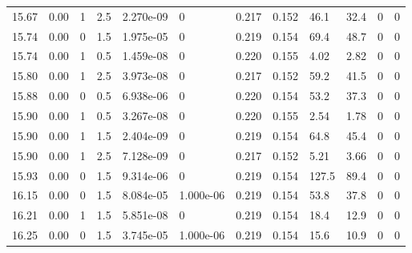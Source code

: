 \documentclass[preview]{standalone}
\begin{document}
{{{{{{{\begin{tabular}{L{1.2cm}C{1.2cm} C{0.3cm}C{0.5cm} C{1.4cm}C{1.4cm} C{1.4cm}C{1.4cm} C{1.6cm}C{1.6cm} C{1.6cm}C{1.6cm}}
  15.67  &  0.00  & 1     & 2.5 &  2.270e-09  & 0  &  0.217&   0.152& 46.1 & 32.4   &  0 & 0  \\ 
  15.74  &  0.00  & 0     & 1.5 &  1.975e-05  & 0  &  0.219&   0.154& 69.4 & 48.7   &  0 & 0  \\ 
  15.74  &  0.00  & 1     & 0.5 &  1.459e-08  & 0  &  0.220&   0.155& 4.02 & 2.82   &  0 & 0  \\ 
  15.80  &  0.00  & 1     & 2.5 &  3.973e-08  & 0  &  0.217&   0.152& 59.2 & 41.5   &  0 & 0  \\ 
  15.88  &  0.00  & 0     & 0.5 &  6.938e-06  & 0  &  0.220&   0.154& 53.2 & 37.3   &  0 & 0  \\ 
  15.90  &  0.00  & 1     & 0.5 &  3.267e-08  & 0  &  0.220&   0.155& 2.54 & 1.78   &  0 & 0  \\ 
  15.90  &  0.00  & 1     & 1.5 &  2.404e-09  & 0  &  0.219&   0.154& 64.8 & 45.4   &  0 & 0  \\ 
  15.90  &  0.00  & 1     & 2.5 &  7.128e-09  & 0  &  0.217&   0.152& 5.21 & 3.66   &  0 & 0  \\ 
  15.93  &  0.00  & 0     & 1.5 &  9.314e-06  & 0  &  0.219&   0.154& 127.5 & 89.4   &  0 & 0  \\ 
  16.15  &  0.00  & 0     & 1.5 &  8.084e-05  & 1.000e-06  &  0.219&   0.154& 53.8 & 37.8   &  0 & 0  \\ 
  16.21  &  0.00  & 1     & 1.5 &  5.851e-08  & 0  &  0.219&   0.154& 18.4 & 12.9   &  0 & 0  \\ 
  16.25  &  0.00  & 0     & 1.5 &  3.745e-05  & 1.000e-06  &  0.219&   0.154& 15.6 & 10.9   &  0 & 0  \\ 
\hline 
\end{tabular} 

}}}}}}}
\end{document}
